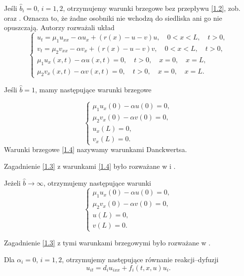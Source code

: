 	Jeśli $\hat{b}_i=0$, $i=1,2$, otrzymujemy warunki brzegowe bez przepływu \eqref{1.2}, zob. \cite{Huisman} oraz \cite{Kolokolnikov}. Oznacza to, że żadne osobniki nie wchodzą do siedliska ani go nie opuszczają.
	Autorzy rozważali układ
	\begin{equation}
		\label{1.3}
		\begin{cases}
			u_t=\mu_1u_{xx} -\alpha u_x+ (r(x) - u - v)u,\quad 0<x<L,\quad t>0,\\
			v_t=\mu_2  v_{xx} -\alpha v_x +(r(x)-u-v)v,\quad 0<x<L,\quad t>0,\\
			\mu_1 u_{x}(x,t) - \alpha u(x,t)=0, \quad t>0,\quad x=0,\quad x=L,\\
			\mu_2 v_{x}(x,t) - \alpha v(x,t) = 0, \quad t>0,\quad x=0,\quad x=L.
		\end{cases}
	\end{equation}
	
	Jeśli $\hat{b}=1$, mamy następujące warunki brzegowe
	
	\begin{equation}
		\label{1.4}
		\begin{cases}
			\mu_1 u_x(0)  - \alpha u(0)=0,\\
			\mu_2 v_x(0) - \alpha v(0)=0,\\
			u_x(L)=0,\\
			v_x(L)=0.
		\end{cases}
	\end{equation}
	 Warunki brzegowe \eqref{1.4}
	nazywamy warunkami Danckwertsa.
	
	Zagadnienie \eqref{1.3} z warunkami \eqref{1.4} było rozważane w  \cite{Lutscher} i \cite{Vasilyeva} .
	
	Jeżeli $\hat{b} \to \infty$, otrzymujemy następujące warunki
	\begin{equation}
		\begin{cases}
			\mu_1 u_x(0)  - \alpha u(0)=0,\\
			\mu_2 v_x(0) - \alpha v(0)=0,\\
			u(L)=0,\\
			v(L)=0.
		\end{cases}
	\end{equation}
	
	Zagadnienie \eqref{1.3} z tymi warunkami brzegowymi było rozważane w \cite{Ma}.
	
	Dla $\alpha_i=0$, $i=1,2$, otrzymujemy następujące równanie reakcji–dyfuzji  
	\begin{equation}
		\label{1.5}
		u_{it}=d_i u_{ixx} +f_i(t,x,u)u_i.
	\end{equation}
	
